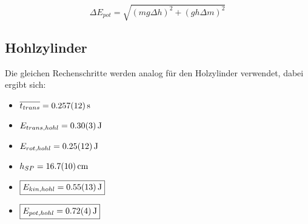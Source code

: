 \begin{equation}
    \Delta E_{pot} = \sqrt{(mg\Delta h)^2 + (gh\Delta m)^2}
\end{equation}

\subsection{Hohlzylinder}

Die gleichen Rechenschritte werden analog für den Holzylinder verwendet, dabei ergibt sich:

\begin{itemize}
    \item $\overline{t_{trans}} = \SI{0,257 \pm 0,012}{\second}$
    \item $E_{trans,hohl} = \SI{0,30 \pm 0,03}{\joule}$
    \item $E_{rot,hohl} = \SI{0,25 \pm 0,12}{\joule}$   
    \item $h_{SP} = \SI{16,7 \pm 1,0}{\cm}$
    \item $\boxed{E_{kin,hohl} = \SI{0,55 \pm 0,13}{\joule}}$
    \item $\boxed{E_{pot,hohl} = \SI{0,72 \pm 0,04}{\joule}}$
\end{itemize}